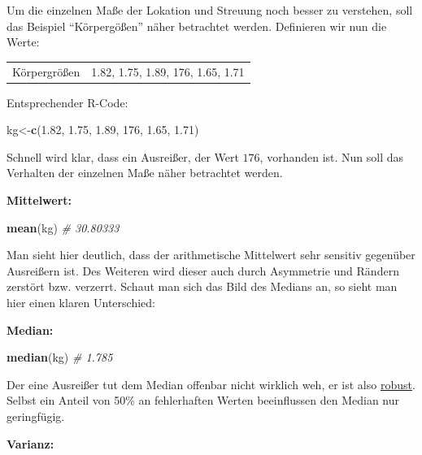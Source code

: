 \documentclass[
]{article}
\newenvironment{Shaded}{\begin{snugshade}}{\end{snugshade}}
\newcommand{\CommentTok}[1]{\textcolor[rgb]{0.56,0.35,0.01}{\textit{#1}}}
\newcommand{\DecValTok}[1]{\textcolor[rgb]{0.00,0.00,0.81}{#1}}
\newcommand{\FloatTok}[1]{\textcolor[rgb]{0.00,0.00,0.81}{#1}}
\newcommand{\FunctionTok}[1]{\textcolor[rgb]{0.13,0.29,0.53}{\textbf{#1}}}
\newcommand{\NormalTok}[1]{#1}
\newcommand{\OtherTok}[1]{\textcolor[rgb]{0.56,0.35,0.01}{#1}}
\begin{document}
Um die einzelnen Maße der Lokation und Streuung noch besser zu
verstehen, soll das Beispiel ``Körpergößen'' näher betrachtet werden.
Definieren wir nun die Werte:

\begin{longtable}[]{@{}ll@{}}
\toprule\noalign{}
\endhead
\bottomrule\noalign{}
\endlastfoot
Körpergrößen & 1.82, 1.75, 1.89, 176, 1.65, 1.71 \\
\end{longtable}

Entsprechender R-Code:

\begin{Shaded}
\begin{Highlighting}[]
\NormalTok{kg}\OtherTok{\textless{}{-}}\FunctionTok{c}\NormalTok{(}\FloatTok{1.82}\NormalTok{, }\FloatTok{1.75}\NormalTok{, }\FloatTok{1.89}\NormalTok{, }\DecValTok{176}\NormalTok{, }\FloatTok{1.65}\NormalTok{, }\FloatTok{1.71}\NormalTok{)}
\end{Highlighting}
\end{Shaded}

Schnell wird klar, dass ein Ausreißer, der Wert \(176\), vorhanden ist.
Nun soll das Verhalten der einzelnen Maße näher betrachtet werden.

\textbf{Mittelwert:}

\begin{Shaded}
\begin{Highlighting}[]
\FunctionTok{mean}\NormalTok{(kg) }\CommentTok{\# 30.80333}
\end{Highlighting}
\end{Shaded}

Man sieht hier deutlich, dass der arithmetische Mittelwert sehr sensitiv
gegenüber Ausreißern ist. Des Weiteren wird dieser auch durch Asymmetrie
und Rändern zerstört bzw. verzerrt. Schaut man sich das Bild des Medians
an, so sieht man hier einen klaren Unterschied:

\textbf{Median:}

\begin{Shaded}
\begin{Highlighting}[]
\FunctionTok{median}\NormalTok{(kg) }\CommentTok{\# 1.785}
\end{Highlighting}
\end{Shaded}

Der eine Ausreißer tut dem Median offenbar nicht wirklich weh, er ist
also \underline{robust}. Selbst ein Anteil von 50\% an fehlerhaften
Werten beeinflussen den Median nur geringfügig.

\textbf{Varianz:}
\end{document}
